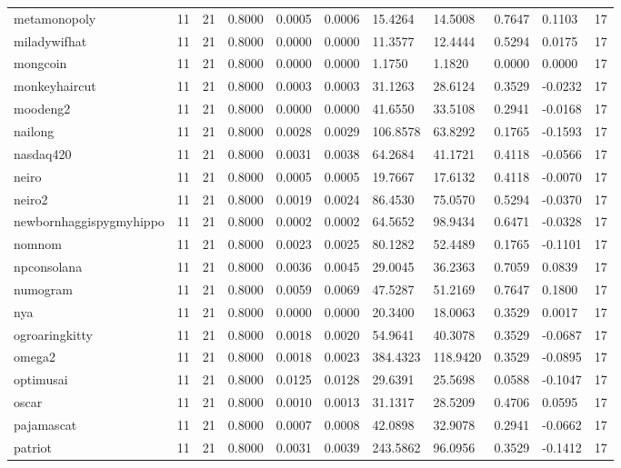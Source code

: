\begin{table}[htbp]
\begin{tabular}{lllllllllll}
metamonopoly & 11 & 21 & 0.8000 & 0.0005 & 0.0006 & 15.4264 & 14.5008 & 0.7647 & 0.1103 & 17 \\
miladywifhat & 11 & 21 & 0.8000 & 0.0000 & 0.0000 & 11.3577 & 12.4444 & 0.5294 & 0.0175 & 17 \\
mongcoin & 11 & 21 & 0.8000 & 0.0000 & 0.0000 & 1.1750 & 1.1820 & 0.0000 & 0.0000 & 17 \\
monkeyhaircut & 11 & 21 & 0.8000 & 0.0003 & 0.0003 & 31.1263 & 28.6124 & 0.3529 & -0.0232 & 17 \\
moodeng2 & 11 & 21 & 0.8000 & 0.0000 & 0.0000 & 41.6550 & 33.5108 & 0.2941 & -0.0168 & 17 \\
nailong & 11 & 21 & 0.8000 & 0.0028 & 0.0029 & 106.8578 & 63.8292 & 0.1765 & -0.1593 & 17 \\
nasdaq420 & 11 & 21 & 0.8000 & 0.0031 & 0.0038 & 64.2684 & 41.1721 & 0.4118 & -0.0566 & 17 \\
neiro & 11 & 21 & 0.8000 & 0.0005 & 0.0005 & 19.7667 & 17.6132 & 0.4118 & -0.0070 & 17 \\
neiro2 & 11 & 21 & 0.8000 & 0.0019 & 0.0024 & 86.4530 & 75.0570 & 0.5294 & -0.0370 & 17 \\
newbornhaggispygmyhippo & 11 & 21 & 0.8000 & 0.0002 & 0.0002 & 64.5652 & 98.9434 & 0.6471 & -0.0328 & 17 \\
nomnom & 11 & 21 & 0.8000 & 0.0023 & 0.0025 & 80.1282 & 52.4489 & 0.1765 & -0.1101 & 17 \\
npconsolana & 11 & 21 & 0.8000 & 0.0036 & 0.0045 & 29.0045 & 36.2363 & 0.7059 & 0.0839 & 17 \\
numogram & 11 & 21 & 0.8000 & 0.0059 & 0.0069 & 47.5287 & 51.2169 & 0.7647 & 0.1800 & 17 \\
nya & 11 & 21 & 0.8000 & 0.0000 & 0.0000 & 20.3400 & 18.0063 & 0.3529 & 0.0017 & 17 \\
ogroaringkitty & 11 & 21 & 0.8000 & 0.0018 & 0.0020 & 54.9641 & 40.3078 & 0.3529 & -0.0687 & 17 \\
omega2 & 11 & 21 & 0.8000 & 0.0018 & 0.0023 & 384.4323 & 118.9420 & 0.3529 & -0.0895 & 17 \\
optimusai & 11 & 21 & 0.8000 & 0.0125 & 0.0128 & 29.6391 & 25.5698 & 0.0588 & -0.1047 & 17 \\
oscar & 11 & 21 & 0.8000 & 0.0010 & 0.0013 & 31.1317 & 28.5209 & 0.4706 & 0.0595 & 17 \\
pajamascat & 11 & 21 & 0.8000 & 0.0007 & 0.0008 & 42.0898 & 32.9078 & 0.2941 & -0.0662 & 17 \\
patriot & 11 & 21 & 0.8000 & 0.0031 & 0.0039 & 243.5862 & 96.0956 & 0.3529 & -0.1412 & 17 \\

\end{tabular}
\end{table}
